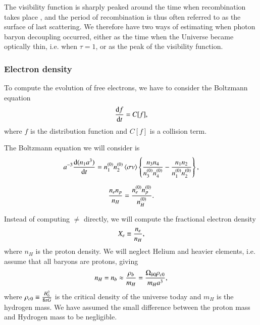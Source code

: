 The visibility function is sharply peaked around the time when recombination takes place , and the period of recombination is thus often referred to as the surface of last scattering. We therefore have two ways of estimating when photon baryon decoupling occurred, either as the time when the Universe became optically thin, i.e. when $\tau=1$, or as the peak of the visibility function.   

\subsubsection{Electron density } \label{sssec:M2_electron_density}
To compute the evolution of free electrons, we have to consider the Boltzmann equation 
\begin{equation} \label{eq:M2:theory:Boltzmann_equation}
    \dv{f}{t} = C[f],
\end{equation}
where $f$ is the distribution function and $C[f]$ is a collision term.  


The Boltzmann equation we will consider is 
\begin{equation}
    a^{-3}\dv{(n_1 a^3)}{t} = \equilibriumn[1] \equilibriumn[2] \expval{\sigma v} \BBclosed{\frac{n_3 n_4}{\equilibriumn[3] \equilibriumn[4]} - \frac{n_1 n_2}{\equilibriumn[1] \equilibriumn[2]}},
\end{equation}


\begin{equation} \label{eq:M2:theory:saha_equation_recombination_approximation}
    \frac{n_e n_p}{n_H} = \frac{\equilibriumn[e]\equilibriumn[p]}{\equilibriumn[H]}.
\end{equation}


Instead of computing $\ne$ directly, we will compute the fractional electron density
\begin{equation} \label{eq:M2:theory:X_e_definition}
    \Xe \equiv \frac{\ne}{n_H},
\end{equation}
where $n_H$ is the proton density. We will neglect Helium and heavier elements, i.e. assume that all baryons are protons, giving  
\begin{equation} \label{eq:M2:theory:helium_baryon_number_density}
    n_H=n_b \approx \frac{\rho_b}{m_H} = \frac{\obn \rhocn}{m_H a^3},
\end{equation}
where $\rhocn\equiv \frac{ H_0^2}{8\pi G}$ is the critical density of the universe today and $m_H$ is the hydrogen mass. We have assumed the small difference between the proton mass and Hydrogen mass to be negligible.

